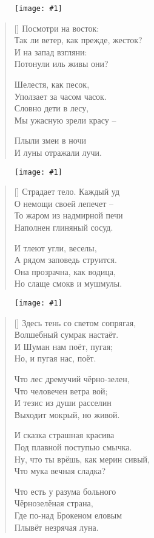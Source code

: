 \documentclass[12pt,a5paper,twoside]{article}
\newcommand{\pict}[1]{\thispagestyle{empty}\begin{figure}[H]\begin{center}\texttt{[image: \#1]}\end{center}\end{figure}\newpage}
\begin{document}
\pict{picts/Posmotry_na_vostok} 


\settowidth{\versewidth}{Посмотри на восток:}
\begin{verse}[\versewidth]
Посмотри на восток:\\
Так ли ветер, как прежде, жесток?\\
И на запад взгляни:\\
Потонули иль живы они?

Шелестя, как песок,\\
Уползает за часом часок.\\
Словно дети в лесу,\\
Мы ужасную зрели красу –

Плыли змеи в ночи\\
И луны отражали лучи.
\end{verse}
\newpage

\pict{picts/Stradaet_telo} 


\settowidth{\versewidth}{Страдает тело. Каждый уд}
\begin{verse}[\versewidth]
Страдает тело. Каждый уд\\
О немощи своей лепечет –\\
То жаром из надмирной печи\\
Наполнен глиняный сосуд.

И тлеют угли, веселы,\\
А рядом заповедь струится.\\
Она прозрачна, как водица,\\
Но слаще смокв и мушмулы.
\end{verse}
\newpage

\pict{picts/Zdes'_ten'_so_svetom} 


\settowidth{\versewidth}{Здесь тень со светом сопрягая,}
\begin{verse}[\versewidth]
Здесь тень со светом сопрягая,\\
Волшебный сумрак настаёт.\\
И Шуман нам поёт, пугая;\\
Но, и пугая нас, поёт.

Что лес дремучий чёрно-зелен,\\
Что человечен ветра вой;\\
И тезис из души расселин\\
Выходит мокрый, но живой.

И сказка страшная красива\\
Под плавной поступью смычка.\\
Ну, что ты врёшь, как мерин сивый,\\
Что мука вечная сладка?

Что есть у разума больного\\
Чёрнозелёная страна,\\
Где по-над Брокеном еловым\\
Плывёт незрячая луна.
\end{verse}
\newpage
\end{document}
